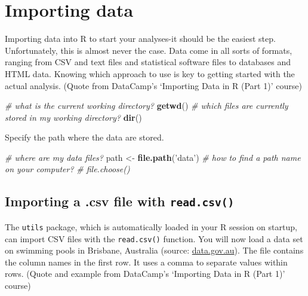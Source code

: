 \documentclass[
]{book}
\newenvironment{Shaded}{\begin{snugshade}}{\end{snugshade}}
\newcommand{\CommentTok}[1]{\textcolor[rgb]{0.56,0.35,0.01}{\textit{#1}}}
\newcommand{\KeywordTok}[1]{\textcolor[rgb]{0.13,0.29,0.53}{\textbf{#1}}}
\newcommand{\NormalTok}[1]{#1}
\newcommand{\StringTok}[1]{\textcolor[rgb]{0.31,0.60,0.02}{#1}}
\begin{document}
\hypertarget{importing-data}{%
\section{Importing data}\label{importing-data}}

Importing data into R to start your analyses-it should be the easiest step. Unfortunately, this is almost never the case. Data come in all sorts of formats, ranging from CSV and text files and statistical software files to databases and HTML data. Knowing which approach to use is key to getting started with the actual analysis. (Quote from DataCamp's `Importing Data in R (Part 1)' course)

\begin{Shaded}
\begin{Highlighting}[]
\CommentTok{# what is the current working directory?}
\KeywordTok{getwd}\NormalTok{()}
\CommentTok{# which files are currently stored in my working directory?}
\KeywordTok{dir}\NormalTok{()}
\end{Highlighting}
\end{Shaded}

Specify the path where the data are stored.

\begin{Shaded}
\begin{Highlighting}[]
\CommentTok{# where are my data files?}
\NormalTok{path <-}\StringTok{ }\KeywordTok{file.path}\NormalTok{(}\StringTok{'data'}\NormalTok{)}
\CommentTok{# how to find a path name on your computer?}
\CommentTok{# file.choose()}
\end{Highlighting}
\end{Shaded}

\hypertarget{importing-a-.csv-file-with-read.csv}{%
\subsection{\texorpdfstring{Importing a .csv file with \texttt{read.csv()}}{Importing a .csv file with read.csv()}}\label{importing-a-.csv-file-with-read.csv}}

The \texttt{utils} package, which is automatically loaded in your R session on startup, can import CSV files with the \texttt{read.csv()} function. You will now load a data set on swimming pools in Brisbane, Australia (source: \url{data.gov.au}). The file contains the column names in the first row. It uses a comma to separate values within rows. (Quote and example from DataCamp's `Importing Data in R (Part 1)' course)
\end{document}
